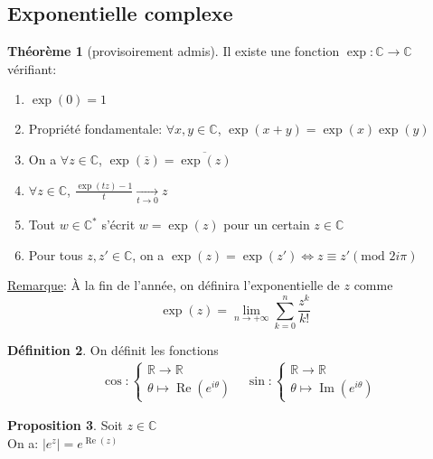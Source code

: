 \documentclass[10pt,a4paper]{article}
\theoremstyle{definition}
\newtheorem{proposition}{Proposition}[section]
\newtheorem{theorem}[proposition]{Théorème}
\newtheorem{definition}[proposition]{Définition}
\DeclareMathOperator{\re}{Re}
\DeclareMathOperator{\im}{Im}
\begin{document}
\subsection{Exponentielle complexe}
\begin{theorem}[provisoirement admis]
Il existe une fonction $\exp: \mathbb{C} \to \mathbb{C}$ vérifiant:
\begin{enumerate}
\item $\exp(0) = 1$
\item Propriété fondamentale: $\forall x, y \in \mathbb{C}$, $\exp(x + y) = \exp(x) \exp(y)$
\item On a $\forall z \in \mathbb{C}$, $\exp(\overline{z}) = \overline{\exp(z)}$
\item $\forall z \in \mathbb{C}$, $\frac{\exp(tz) - 1}{t} \xrightarrow[t \to 0]{} z$
\item Tout $w \in \mathbb{C}^*$ s'écrit $w = \exp(z)$ pour un certain $z \in \mathbb{C}$
\item Pour tous $z, z' \in \mathbb{C}$, on a $\exp(z) = \exp(z') \iff z \equiv z' (\text{mod }2i\pi)$
\end{enumerate}
\end{theorem}
\noindent \uline{Remarque}: À la fin de l'année, on définira l'exponentielle de $z$ comme
\[ \exp(z) = \lim_{n \to +\infty} \sum_{k = 0}^n \frac{z^k}{k!} \]
\begin{definition}
On définit les fonctions
\begin{align*}
&\cos : \begin{cases}
\mathbb{R} \to \mathbb{R} \\
\theta \mapsto \re(e^{i\theta})
\end{cases}
&\sin : \begin{cases}
\mathbb{R} \to \mathbb{R} \\
\theta \mapsto \im(e^{i\theta})
\end{cases}
\end{align*}
\end{definition}
\begin{proposition}
Soit $z \in \mathbb{C}$ \\
On a: $|e^z| = e^{\re(z)}$
\end{proposition}
\end{document}
